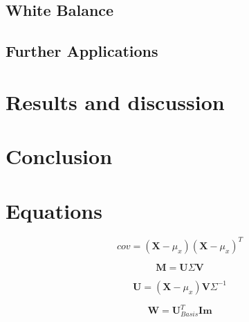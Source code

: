 \documentclass{article}
\begin{document}
\subsection{White Balance}

\subsection{Further Applications}


\section{Results and discussion}

\section{Conclusion}


\section{Equations} 
\begin{equation}
    cov = (\textbf{X} - \mu_{x})(\textbf{X} - \mu_{x})^{T}
\end{equation}

\begin{equation}
    \textbf{M} = \textbf{U} \textbf{$\Sigma$} \textbf{V}
\end{equation}

\begin{equation}
    \textbf{U} = (\textbf{X} - \mu_{x}) \textbf{V} \Sigma^{-1}
\end{equation}

\begin{equation}
    \textbf{W} = \textbf{U}_{Basis}^{T} \textbf{Im}
\end{equation}




\end{document}
